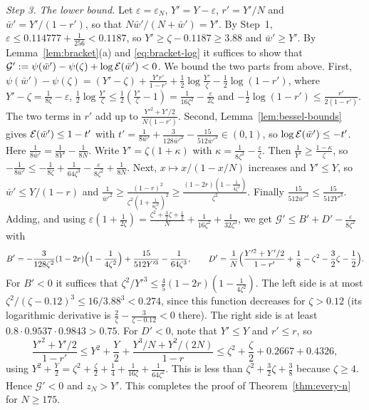\emph{Step 3. The lower bound.} Let $\varepsilon=\varepsilon_N$,
$Y'=Y-\varepsilon$, $r'=Y'/N$ and $\bar w'=Y'/(1-r')$, so that
$N\bar w'/(N+\bar w')=Y'$. By Step~1, $\varepsilon\le0.114777+\frac1{256}<0.1187$, so
$Y'\ge\zeta-0.1187\ge3.88$ and $\bar w'\ge Y'$. By Lemma~\ref{lem:bracket}(a)
and \eqref{eq:bracket-log} it suffices to show that
$\mathcal G':=\psi(\bar w')-\psi(\zeta)+\log \mathcal E(\bar w')<0$. We bound the two parts from above.
First,
$\psi(\bar w')-\psi(\zeta)=(Y'-\zeta)+\frac{Y' r'}{1-r'}+\frac12\log\frac{Y'}\zeta-\frac12\log(1-r')$,
where $Y'-\zeta=\frac1{8\zeta}-\varepsilon$,
$\frac12\log\frac{Y'}\zeta\le\frac12(\frac{Y'}\zeta-1)=\frac1{16\zeta^2}-\frac\varepsilon{2\zeta}$
and $-\frac12\log(1-r')\le\frac{r'}{2(1-r')}$. The two terms in $r'$ add up to
$\frac{Y'^2+Y'/2}{N(1-r')}$. Second, Lemma~\ref{lem:bessel-bounds} gives
$\mathcal E(\bar w')\le1-t'$ with
$t'=\frac1{8\bar w'}+\frac3{128\bar w'^2}-\frac{15}{512\bar w'^3}\in(0,1)$, so
$\log \mathcal E(\bar w')\le-t'$. Here $\frac1{8\bar w'}=\frac1{8Y'}-\frac1{8N}$. Write
$Y'=\zeta(1+\kappa)$ with $\kappa=\frac1{8\zeta^2}-\frac\varepsilon\zeta$.
Then $\frac1{Y'}\ge\frac{1-\kappa}\zeta$, so
$-\frac1{8\bar w'}\le-\frac1{8\zeta}+\frac1{64\zeta^3}-\frac\varepsilon{8\zeta^2}+\frac1{8N}$.
Next, $x\mapsto x/(1-x/N)$ increases and $Y'\le Y$, so $\bar w'\le Y/(1-r)$ and
$\frac1{\bar w'^2}\ge\frac{(1-r)^2}{\zeta^2(1+\frac1{8\zeta^2})^2}\ge\frac{(1-2r)(1-\frac1{4\zeta^2})}{\zeta^2}$.
Finally $\frac{15}{512\bar w'^3}\le\frac{15}{512Y'^3}$. Adding, and using
$\varepsilon(1+\frac1{2\zeta})=\frac{\zeta^2+\frac32\zeta+\frac12}N+\frac1{16\zeta^2}+\frac1{32\zeta^3}$,
we get $\mathcal G'\le B'+D'-\frac\varepsilon{8\zeta^2}$ with
\[
B'=-\frac3{128\zeta^2}(1-2r)\Bigl(1-\frac1{4\zeta^2}\Bigr)+\frac{15}{512Y'^3}-\frac1{64\zeta^3},\qquad
D'=\frac1N\Bigl(\frac{Y'^2+Y'/2}{1-r'}+\frac18-\zeta^2-\frac32\zeta-\frac12\Bigr).
\]
For $B'<0$ it suffices that
$\zeta^2/Y'^3\le\frac45(1-2r)(1-\frac1{4\zeta^2})$. The left side is at most
$\zeta^2/(\zeta-0.12)^3\le16/3.88^3<0.274$, since this function decreases for
$\zeta>0.12$ (its logarithmic derivative is $\frac2\zeta-\frac3{\zeta-0.12}<0$
there). The right side is at least $0.8\cdot0.9537\cdot0.9843>0.75$. For
$D'<0$, note that $Y'\le Y$ and $r'\le r$, so
\[
\frac{Y'^2+Y'/2}{1-r'}\le Y^2+\frac Y2+\frac{Y^3/N+Y^2/(2N)}{1-r}
\le\zeta^2+\frac\zeta2+0.2667+0.4326,
\]
using $Y^2+\frac Y2=\zeta^2+\frac\zeta2+\frac14+\frac1{16\zeta}+\frac1{64\zeta^2}$.
This is less than $\zeta^2+\frac32\zeta+\frac38$ because $\zeta\ge4$. Hence
$\mathcal G'<0$ and $z_N>Y'$. This completes the proof of
Theorem~\ref{thm:every-n} for $N\ge175$.

